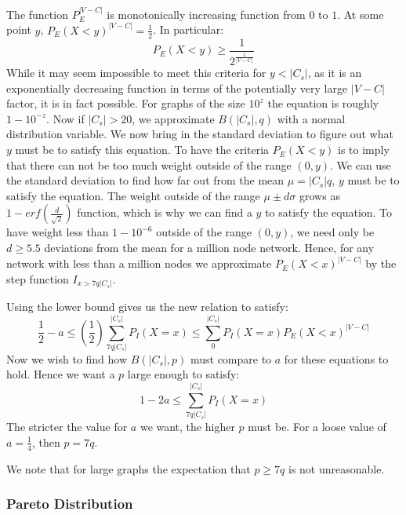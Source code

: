 \documentclass[phd,tocprelim]{cornell}
\begin{document}
The function $P_E^{|V-C|}$ is monotonically increasing function from $0$ to $1$.  At some point $y$,  $P_E(X < y)^{|V-C|} = \frac{1}{2}$.  In particular:
\begin{equation}
P_E(X < y) \geq \frac{1}{2^{\frac{1}{|V-C|}}}
\end{equation}
While it may seem impossible to meet this criteria for $y < |C_s|$, as it is an exponentially decreasing function in terms of the potentially very large $|V-C|$ factor, it is in fact possible.  For graphs of the size $10^z$ the equation is roughly $1 - 10^{-z}$.  Now if $|C_s| > 20$, we approximate $B(|C_s|, q)$ with a normal distribution variable.  We now bring in the standard deviation to figure out what $y$ must be to satisfy this equation.  To have the criteria $P_E(X< y)$ is to imply that there can not be too much weight outside of the range $(0, y)$.  We can use the standard deviation to find how far out from the mean $\mu = |C_s|q$, $y$ must be to satisfy the equation.  The weight outside of the range $\mu \pm d \sigma$ grows as  $1 - erf\left(\frac{d}{\sqrt{2}} \right)$ function, which is why we can find a $y$ to satisfy the equation.  To have weight less than $1 - 10^{-6}$ outside of the range $(0, y)$, we need only be $d \geq 5.5$ deviations from the mean for a million node network.  Hence, for any network with less than a million nodes we approximate $P_E(X<x)^{|V-C|}$ by the step function $I_{x > 7q|C_s|}$.

Using the lower bound gives us the new relation to satisfy:
\begin{equation}
\frac{1}{2} - a \leq  \left(\frac{1}{2} \right) \sum\limits_{7q|C_s|}^{|C_s|} P_I(X = x) \leq \sum\limits_{0}^{|C_s|} P_I(X = x) P_E(X < x)^{|V - C|}
\end{equation}
Now we wish to find how $B(|C_s|, p)$ must compare to $a$ for these equations to hold.  Hence we want a $p$ large enough to satisfy:
\begin{equation}
1 - 2a \leq \sum\limits_{7q|C_s|}^{|C_s|} P_I(X = x)
\end{equation}
The stricter the value for $a$ we want, the higher $p$ must be.  For a loose value of $a = \frac{1}{4}$, then $p = 7 q$.

We note that for large graphs the expectation that $p \geq 7 q$ is not unreasonable.


\subsubsection{Pareto Distribution}
\end{document}
